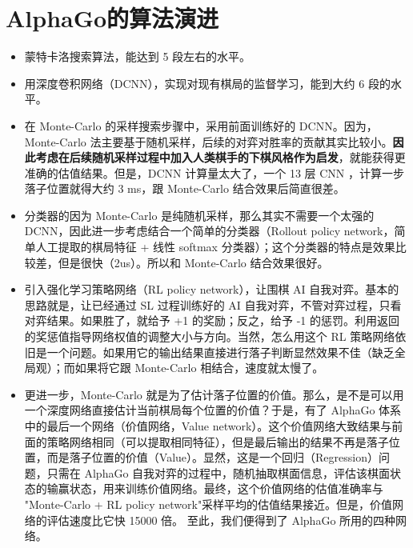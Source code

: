\documentclass[12pt]{article}
\begin{document}
\section{AlphaGo的算法演进}
\begin{itemize}[itemindent=2em]
    \item 蒙特卡洛搜索算法，能达到 5 段左右的水平。
    
    \item 用深度卷积网络（DCNN），实现对现有棋局的监督学习，能到大约 6 段的水平。
    
    \item 在 Monte-Carlo 的采样搜索步骤中，采用前面训练好的 DCNN。因为，Monte-Carlo 法主要基于随机采样，后续的对弈对胜率的贡献其实比较小。\textbf{因此考虑在后续随机采样过程中加入人类棋手的下棋风格作为启发}，就能获得更准确的估值结果。但是，DCNN 计算量太大了，一个 13 层 CNN ，计算一步落子位置就得大约 3 ms，跟 Monte-Carlo 结合效果后简直很差。
    
    \item 分类器的因为 Monte-Carlo 是纯随机采样，那么其实不需要一个太强的 DCNN，因此进一步考虑结合一个简单的分类器（Rollout policy network，简单人工提取的棋局特征 + 线性 softmax 分类器）；这个分类器的特点是效果比较差，但是很快（2us）。所以和 Monte-Carlo 结合效果很好。
    
    \item 引入强化学习策略网络（RL policy network），让围棋 AI 自我对弈。基本的思路就是，让已经通过 SL 过程训练好的 AI 自我对弈，不管对弈过程，只看对弈结果。如果胜了，就给予 +1 的奖励；反之，给予 -1 的惩罚。利用返回的奖惩值指导网络权值的调整大小与方向。当然，怎么用这个 RL 策略网络依旧是一个问题。如果用它的输出结果直接进行落子判断显然效果不佳（缺乏全局观）；而如果将它跟 Monte-Carlo 相结合，速度就太慢了。
    
    \item 更进一步，Monte-Carlo 就是为了估计落子位置的价值。那么，是不是可以用一个深度网络直接估计当前棋局每个位置的价值？于是，有了 AlphaGo 体系中的最后一个网络（价值网络，Value network）。这个价值网络大致结果与前面的策略网络相同（可以提取相同特征），但是最后输出的结果不再是落子位置，而是落子位置的价值（Value）。显然，这是一个回归（Regression）问题，只需在 AlphaGo 自我对弈的过程中，随机抽取棋面信息，评估该棋面状态的输赢状态，用来训练价值网络。最终，这个价值网络的估值准确率与 "Monte-Carlo + RL policy network"采样平均的估值结果接近。但是，价值网络的评估速度比它快 15000 倍。
    至此，我们便得到了 AlphaGo 所用的四种网络。
\end{itemize}
\end{document}
